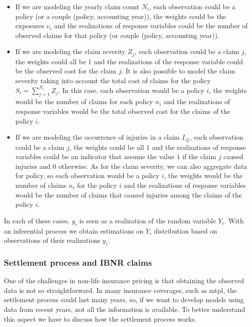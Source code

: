 \documentclass[a4paper, twoside, openright, 12pt]{report}
\providecommand{\tightlist}{%
  \setlength{\itemsep}{0pt}\setlength{\parskip}{0pt}}
\theoremstyle{definition}
\theoremstyle{definition}
\theoremstyle{definition}
\theoremstyle{remark}
\begin{document}
\begin{itemize}
\tightlist
\item
  If we are modeling the yearly claim count \(N_i\), each observation could be a policy (or a couple (policy, accounting year)), the weights could be the exposures \(v_i\) and the realizations of response variables could be the number of observed claims for that policy (or couple (policy, accounting year)).
\item
  If we are modeling the claim severity \(Z_j\), each observation could be a claim \(j\), the weights could all be \(1\) and the realizations of the response variable could be the observed cost for the claim \(j\). It is also possible to model the claim severity taking into account the total cost of claims for the policy \(S_i = \sum_{j=1}^{N_i}{Z_j}\). In this case, each observation would be a policy \(i\), the weights would be the number of claims for each policy \(n_i\) and the realizations of response variables would be the total observed cost for the claims of the policy \(i\).
\item
  If we are modeling the occurrence of injuries in a claim \(I_{Jj}\), each observation could be a claim \(j\), the weights could be all \(1\) and the realizations of response variables could be an indicator that assume the value \(1\) if the claim \(j\) caused injuries and \(0\) otherwise. As for the claim severity, we can also aggregate data for policy, so each observation would be a policy \(i\), the weights would be the number of claims \(n_i\) for the policy \(i\) and the realizations of response variables would be the number of claims that caused injuries among the claims of the policy \(i\).
\end{itemize}

In each of these cases, \(y_i\) is seen as a realization of the random variable \(Y_i\). With an inferential process we obtain estimations on \(Y_i\) distribution based on observations of their realizations \(y_i\).

\hypertarget{settlement-process-and-ibnr-claims}{%
\subsubsection{Settlement process and IBNR claims}\label{settlement-process-and-ibnr-claims}}

One of the challenges in non-life insurance pricing is that obtaining the observed data is not so straightforward. In many insurance coverages, such as \ac{mtpl}, the settlement process could last many years, so, if we want to develop models using data from recent years, not all the information is available. To better understand this aspect we have to discuss how the settlement process works.
\end{document}
